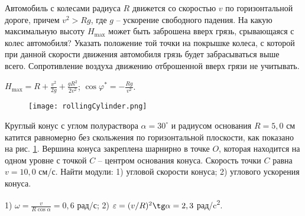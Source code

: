 \begin{ex} %
Автомобиль с колесами радиуса $R$ движется со скоростью $v$ по горизонтальной дороге, причем $v^2 > Rg$, где $g$ -- ускорение свободного падения. На какую максимальную высоту $H_{\max}$ может быть заброшена вверх грязь, срывающаяся с колес автомобиля? Указать положение той точки на покрышке колеса, с которой при данной скорости движения автомобиля грязь будет забрасываться выше всего. Сопротивление воздуха движению отброшенной вверх грязи не учитывать.
\begin{ans}
$H_{\max} = R + \frac{v^2}{2g} + \frac{gR^2}{2v^2}$; $\cos \varphi^{*} = - \frac{Rg}{v^2}$.
\end{ans}
\end{ex}

\begin{ex} %

\begin{figure}[h]
\centering
\texttt{[image: rollingCylinder.png]}
\caption{}
\label{rollingCylinder}
\end{figure}

Круглый конус с углом полураствора $\alpha = 30^{\circ}$ и радиусом основания $R = 5,0$ см катится равномерно без скольжения по горизонтальной плоскости, как показано на рис. \ref{rollingCylinder}. Вершина конуса закреплена шарнирно в точке $O$, которая находится на одном уровне с точкой $C$ -- центром основания конуса. Скорость точки $C$ равна $v = 10,0$ см/с. Найти модули: 1) угловой скорости конуса; 2) углового ускорения конуса.

\begin{ans}
1) $\omega = \frac{v}{R \cos \alpha} = 0,6$ рад/с; 2) $\varepsilon = (v/R)^2 \tg \alpha = 2,3$ рад/c\textsuperscript{2}.
\end{ans}
\end{ex}

\clearpage